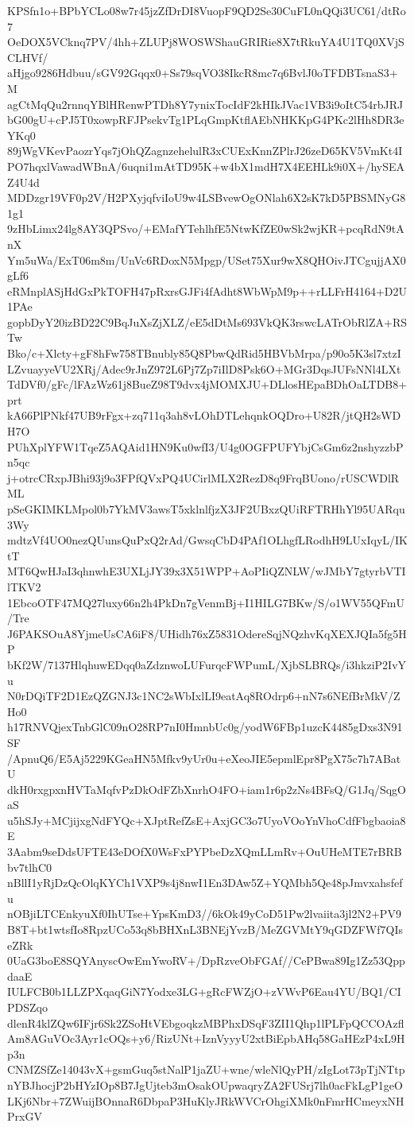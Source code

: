 KPSfn1o+BPbYCLo08w7r45jzZfDrDI8VuopF9QD2Se30CuFL0nQQi3UC61/dtRo7
OeDOX5VCknq7PV/4hh+ZLUPj8WOSWShauGRIRie8X7tRkuYA4U1TQ0XVjSCLHVf/
aHjgo9286Hdbuu/sGV92Gqqx0+Ss79sqVO38IkcR8mc7q6BvlJ0oTFDBTsnaS3+M
agCtMqQu2rnnqYBlHRenwPTDh8Y7ynixTocIdF2kHIkJVac1VB3i9oItC54rbJRJ
bG00gU+cPJ5T0xowpRFJPsekvTg1PLqGmpKtflAEbNHKKpG4PKc2lHh8DR3eYKq0
89jWgVKevPaozrYqs7jOhQZagnzehelulR3xCUExKnnZPlrJ26zeD65KV5VmKt4I
PO7hqxlVawadWBnA/6uqni1mAtTD95K+w4bX1mdH7X4EEHLk9i0X+/hySEAZ4U4d
MDDzgr19VF0p2V/H2PXyjqfviIoU9w4LSBvewOgONlah6X2sK7kD5PBSMNyG81g1
9zHbLimx24lg8AY3QPSvo/+EMafYTehlhfE5NtwKfZE0wSk2wjKR+pcqRdN9tAnX
Ym5uWa/ExT06m8m/UnVc6RDoxN5Mpgp/USet75Xur9wX8QHOivJTCgujjAX0gLf6
eRMnplASjHdGxPkTOFH47pRxrsGJFi4fAdht8WbWpM9p++rLLFrH4164+D2U1PAe
gopbDyY20izBD22C9BqJuXsZjXLZ/eE5dDtMs693VkQK3rswcLATrObRlZA+RSTw
Bko/c+Xlcty+gF8hFw758TBnubly85Q8PbwQdRid5HBVbMrpa/p90o5K3sl7xtzI
LZvuayyeVU2XRj/Adec9rJnZ972L6Pj7Zp7iIlD8Psk6O+MGr3DqsJUFsNNl4LXt
TdDVf0/gFc/lFAzWz61j8BueZ98T9dvx4jMOMXJU+DLlosHEpaBDhOaLTDB8+prt
kA66PlPNkf47UB9rFgx+zq711q3ah8vLOhDTLehqnkOQDro+U82R/jtQH2sWDH7O
PUhXplYFW1TqeZ5AQAid1HN9Ku0wfI3/U4g0OGFPUFYbjCsGm6z2nshyzzbPn5qc
j+otrcCRxpJBhi93j9o3FPfQVxPQ4UCirlMLX2RezD8q9FrqBUono/rUSCWDlRML
pSeGKIMKLMpol0b7YkMV3awsT5xklnlfjzX3JF2UBxzQUiRFTRHhYl95UARqu3Wy
mdtzVf4UO0nezQUunsQuPxQ2rAd/GwsqCbD4PAf1OLhgfLRodhH9LUxIqyL/IKtT
MT6QwHJaI3qhnwhE3UXLjJY39x3X51WPP+AoPIiQZNLW/wJMbY7gtyrbVTIlTKV2
1EbcoOTF47MQ27luxy66n2h4PkDn7gVenmBj+I1HILG7BKw/S/o1WV55QFmU/Tre
J6PAKSOuA8YjmeUsCA6iF8/UHidh76xZ5831OdereSqjNQzhvKqXEXJQIa5fg5HP
bKf2W/7137HlqhuwEDqq0aZdznwoLUFurqcFWPumL/XjbSLBRQs/i3hkziP2IvYu
N0rDQiTF2D1EzQZGNJ3c1NC2sWbIxlLI9eatAq8ROdrp6+nN7s6NEfBrMkV/ZHo0
h17RNVQjexTnbGlC09nO28RP7nI0HmnbUc0g/yodW6FBp1uzcK4485gDxs3N91SF
/ApnuQ6/E5Aj5229KGeaHN5Mfkv9yUr0u+eXeoJIE5epmlEpr8PgX75c7h7ABatU
dkH0rxgpxnHVTaMqfvPzDkOdFZbXnrhO4FO+iam1r6p2zNs4BFsQ/G1Jq/SqgOaS
u5hSJy+MCjijxgNdFYQc+XJptRefZsE+AxjGC3o7UyoVOoYnVhoCdfFbgbaoia8E
3Aabm9seDdsUFTE43eDOfX0WsFxPYPbeDzXQmLLmRv+OuUHeMTE7rBRBbv7tlhC0
nBllI1yRjDzQcOlqKYCh1VXP9s4j8nwI1En3DAw5Z+YQMbh5Qe48pJmvxahsfefu
nOBjiLTCEnkyuXf0IhUTse+YpsKmD3//6kOk49yCoD51Pw2lvaiita3jl2N2+PV9
B8T+bt1wtsfIo8RpzUCo53q8bBHXnL3BNEjYvzB/MeZGVMtY9qGDZFWf7QIseZRk
0UaG3boE8SQYAnyscOwEmYwoRV+/DpRzveObFGAf//CePBwa89Ig1Zz53QppdaaE
IULFCB0b1LLZPXqaqGiN7Yodxe3LG+gRcFWZjO+zVWvP6Eau4YU/BQ1/CIPDSZqo
dlenR4klZQw6IFjr6Sk2ZSoHtVEbgoqkzMBPhxDSqF3ZII1Qhp1lPLFpQCCOAzfl
Am8AGuVOc3Ayr1cOQs+y6/RizUNt+IznVyyyU2xtBiEpbAHq58GaHEzP4xL9Hp3n
CNMZSfZe14043vX+gsmGuq5stNalP1jaZU+wne/wleNlQyPH/zIgLot73pTjNTtp
nYBJhocjP2bHYzIOp8B7JgUjteb3mOsakOUpwaqryZA2FUSrj7lh0acFkLgP1geO
LKj6Nbr+7ZWuijBOnnaR6DbpaP3HuKlyJRkWVCrOhgiXMk0nFmrHCmeyxNHPrxGV
